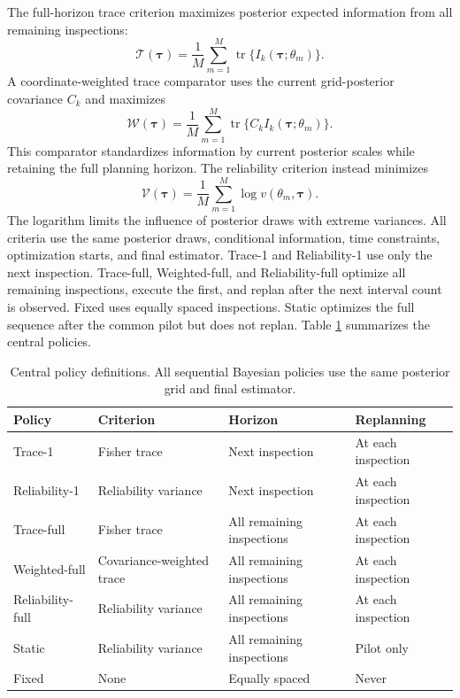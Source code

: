 \documentclass[a4paper,fleqn]{cas-sc}
\begin{document}
The full-horizon trace criterion maximizes posterior expected information from all remaining inspections:
\begin{equation}
\mathcal T(\boldsymbol\tau)=\frac{1}{M}\sum_{m=1}^{M}
\operatorname{tr}\{I_k(\boldsymbol\tau;\theta_m)\}.
\label{eq:trace}
\end{equation}
A coordinate-weighted trace comparator uses the current grid-posterior covariance $C_k$ and maximizes
\begin{equation}
\mathcal W(\boldsymbol\tau)=\frac{1}{M}\sum_{m=1}^{M}
\operatorname{tr}\{C_k I_k(\boldsymbol\tau;\theta_m)\}.
\label{eq:weightedtrace}
\end{equation}
This comparator standardizes information by current posterior scales while retaining the full planning horizon. The reliability criterion instead minimizes
\begin{equation}
\mathcal V(\boldsymbol\tau)=\frac{1}{M}\sum_{m=1}^{M}
\log v(\theta_m,\boldsymbol\tau).
\label{eq:utility}
\end{equation}
The logarithm limits the influence of posterior draws with extreme variances. All criteria use the same posterior draws, conditional information, time constraints, optimization starts, and final estimator. Trace-1 and Reliability-1 use only the next inspection. Trace-full, Weighted-full, and Reliability-full optimize all remaining inspections, execute the first, and replan after the next interval count is observed. Fixed uses equally spaced inspections. Static optimizes the full sequence after the common pilot but does not replan. Table \ref{tab:policies} summarizes the central policies.

\begin{table}[pos=t]
\centering
\caption{Central policy definitions. All sequential Bayesian policies use the same posterior grid and final estimator.}
\label{tab:policies}
\footnotesize
\begin{tabular}{llll}
\toprule
Policy & Criterion & Horizon & Replanning \\
\midrule
Trace-1 & Fisher trace & Next inspection & At each inspection \\
Reliability-1 & Reliability variance & Next inspection & At each inspection \\
Trace-full & Fisher trace & All remaining inspections & At each inspection \\
Weighted-full & Covariance-weighted trace & All remaining inspections & At each inspection \\
Reliability-full & Reliability variance & All remaining inspections & At each inspection \\
Static & Reliability variance & All remaining inspections & Pilot only \\
Fixed & None & Equally spaced & Never \\
\bottomrule
\end{tabular}
\end{table}
\end{document}
